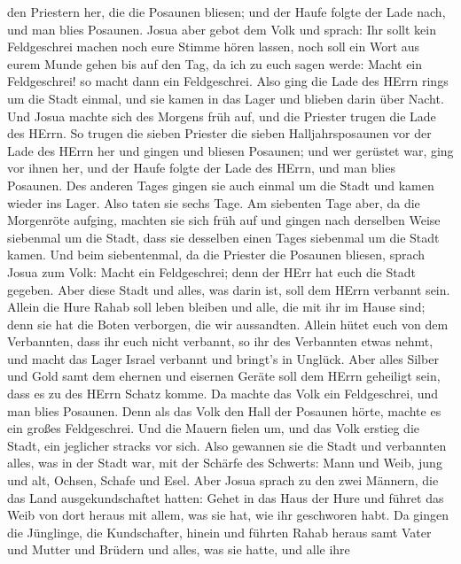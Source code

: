 den Priestern her, die die Posaunen bliesen; und der Haufe folgte der
Lade nach, und man blies Posaunen.  Josua aber gebot dem
Volk und sprach: Ihr sollt kein Feldgeschrei machen noch eure Stimme
hören lassen, noch soll ein Wort aus eurem Munde gehen bis auf den Tag,
da ich zu euch sagen werde: Macht ein Feldgeschrei! so macht dann ein
Feldgeschrei.  Also ging die Lade des HErrn rings um die
Stadt einmal, und sie kamen in das Lager und blieben darin über Nacht.
 Und Josua machte sich des Morgens früh auf, und die
Priester trugen die Lade des HErrn.  So trugen die sieben
Priester die sieben Halljahrsposaunen vor der Lade des HErrn her und
gingen und bliesen Posaunen; und wer gerüstet war, ging vor ihnen her,
und der Haufe folgte der Lade des HErrn, und man blies Posaunen.
 Des anderen Tages gingen sie auch einmal um die Stadt und
kamen wieder ins Lager. Also taten sie sechs Tage.  Am
siebenten Tage aber, da die Morgenröte aufging, machten sie sich früh
auf und gingen nach derselben Weise siebenmal um die Stadt, dass sie
desselben einen Tages siebenmal um die Stadt kamen.  Und
beim siebentenmal, da die Priester die Posaunen bliesen, sprach Josua
zum Volk: Macht ein Feldgeschrei; denn der HErr hat euch die Stadt
gegeben.  Aber diese Stadt und alles, was darin ist, soll
dem HErrn verbannt sein. Allein die Hure Rahab soll leben bleiben und
alle, die mit ihr im Hause sind; denn sie hat die Boten verborgen, die
wir aussandten.  Allein hütet euch von dem Verbannten, dass
ihr euch nicht verbannt, so ihr des Verbannten etwas nehmt, und macht
das Lager Israel verbannt und bringt's in Unglück.  Aber
alles Silber und Gold samt dem ehernen und eisernen Geräte soll dem
HErrn geheiligt sein, dass es zu des HErrn Schatz komme. 
Da machte das Volk ein Feldgeschrei, und man blies Posaunen. Denn als
das Volk den Hall der Posaunen hörte, machte es ein großes Feldgeschrei.
Und die Mauern fielen um, und das Volk erstieg die Stadt, ein jeglicher
stracks vor sich. Also gewannen sie die Stadt  und
verbannten alles, was in der Stadt war, mit der Schärfe des Schwerts:
Mann und Weib, jung und alt, Ochsen, Schafe und Esel.  Aber
Josua sprach zu den zwei Männern, die das Land ausgekundschaftet hatten:
Gehet in das Haus der Hure und führet das Weib von dort heraus mit
allem, was sie hat, wie ihr geschworen habt.  Da gingen die
Jünglinge, die Kundschafter, hinein und führten Rahab heraus samt Vater
und Mutter und Brüdern und alles, was sie hatte, und alle ihre
